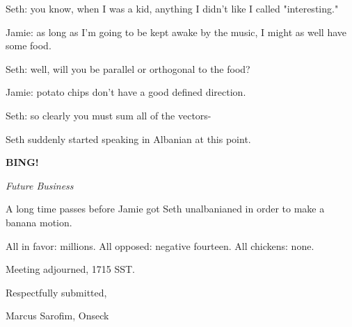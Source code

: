 \documentclass[12pt]{article}
\newcommand{\bing}{{\bf BING!} }
\newcommand{\goto}[1]{\bing \vskip 12pt \centerline{{\em{#1}}}}
\begin{document}
Seth: you know, when I was a kid, anything I didn't like I called "interesting."

Jamie: as long as I'm going to be kept awake by the music, I might as well have some food.

Seth: well, will you be parallel or orthogonal to the food?

Jamie: potato chips don't have a good defined direction.

Seth: so clearly you must sum all of the vectors-

Seth suddenly started speaking in Albanian at this point.

\goto{Future Business}

A long time passes before Jamie got Seth unalbanianed in order to make a banana motion.

All in favor: millions. All opposed: negative fourteen. All chickens: none.

\vspace{12pt}

\noindent
Meeting adjourned, 1715 SST.

\vspace{18pt}

\centerline{Respectfully submitted,}
\centerline{Marcus Sarofim, Onseck}
\end{document}
